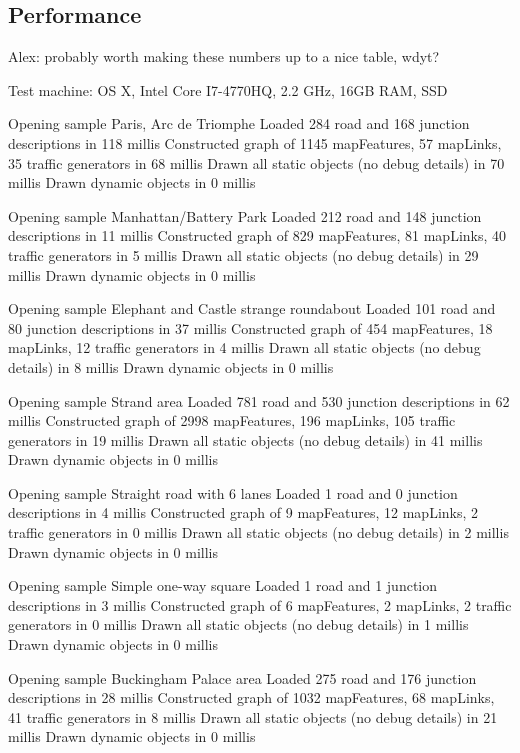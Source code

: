 \subsection{Performance}

Alex: probably worth making these numbers up to a nice table, wdyt?

Test machine: OS X, Intel Core I7-4770HQ, 2.2 GHz, 16GB RAM, SSD

Opening sample Paris, Arc de Triomphe
Loaded 284 road and 168 junction descriptions in 118 millis
Constructed graph of 1145 mapFeatures, 57 mapLinks, 35 traffic generators in 68 millis
Drawn all static objects (no debug details) in 70 millis
Drawn dynamic objects in 0 millis

Opening sample Manhattan/Battery Park
Loaded 212 road and 148 junction descriptions in 11 millis
Constructed graph of 829 mapFeatures, 81 mapLinks, 40 traffic generators in 5 millis
Drawn all static objects (no debug details) in 29 millis
Drawn dynamic objects in 0 millis

Opening sample Elephant and Castle strange roundabout
Loaded 101 road and 80 junction descriptions in 37 millis
Constructed graph of 454 mapFeatures, 18 mapLinks, 12 traffic generators in 4 millis
Drawn all static objects (no debug details) in 8 millis
Drawn dynamic objects in 0 millis


Opening sample Strand area
Loaded 781 road and 530 junction descriptions in 62 millis
Constructed graph of 2998 mapFeatures, 196 mapLinks, 105 traffic generators in 19 millis
Drawn all static objects (no debug details) in 41 millis
Drawn dynamic objects in 0 millis


Opening sample Straight road with 6 lanes
Loaded 1 road and 0 junction descriptions in 4 millis
Constructed graph of 9 mapFeatures, 12 mapLinks, 2 traffic generators in 0 millis
Drawn all static objects (no debug details) in 2 millis
Drawn dynamic objects in 0 millis

Opening sample Simple one-way square
Loaded 1 road and 1 junction descriptions in 3 millis
Constructed graph of 6 mapFeatures, 2 mapLinks, 2 traffic generators in 0 millis
Drawn all static objects (no debug details) in 1 millis
Drawn dynamic objects in 0 millis

Opening sample Buckingham Palace area
Loaded 275 road and 176 junction descriptions in 28 millis
Constructed graph of 1032 mapFeatures, 68 mapLinks, 41 traffic generators in 8 millis
Drawn all static objects (no debug details) in 21 millis
Drawn dynamic objects in 0 millis

